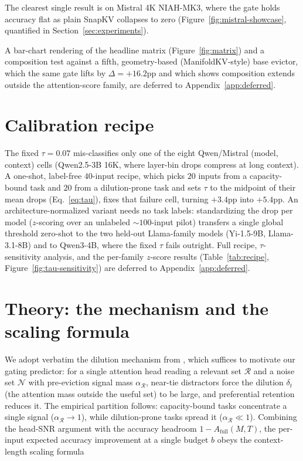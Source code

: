 \documentclass{article}
\begin{document}
The clearest single result is on Mistral 4K NIAH-MK3, where the gate holds
accuracy flat as plain SnapKV collapses to zero
(Figure~\ref{fig:mistral-showcase}, quantified in Section~\ref{sec:experiments}).

A bar-chart rendering of the headline matrix (Figure~\ref{fig:matrix}) and
a composition test against a fifth, geometry-based (ManifoldKV-style) base
evictor, which the same gate lifts by $\Delta = +16.2$pp and which shows
composition extends outside the attention-score family, are deferred to
Appendix~\ref{app:deferred}.

\section{Calibration recipe}
\label{sec:recipe}

The fixed $\tau = 0.07$ mis-classifies only one of the eight
Qwen/Mistral (model, context) cells (Qwen2.5-3B 16K, where layer-bin
drops compress at long context). A one-shot, label-free $40$-input
recipe, which picks $20$ inputs from a capacity-bound task and $20$ from a
dilution-prone task and sets $\tau$ to the midpoint of their mean drops
(Eq.~\eqref{eq:tau}), fixes that failure cell, turning
$+3.4$pp into $+5.4$pp. An architecture-normalized variant needs
no task labels: standardizing the drop per model
($z$-scoring over an unlabeled $\sim 100$-input pilot) transfers a single
global threshold zero-shot to the two held-out Llama-family models
(Yi-1.5-9B, Llama-3.1-8B) and to Qwen3-4B, where the fixed $\tau$ fails
outright. Full recipe, $\tau$-sensitivity analysis, and the per-family
$z$-score results (Table~\ref{tab:recipe},
Figure~\ref{fig:tau-sensitivity}) are deferred to
Appendix~\ref{app:deferred}.

\section{Theory: the mechanism and the scaling formula}
\label{sec:theory}

We adopt verbatim the dilution mechanism from \citet{arxiv260509649},
which suffices to motivate our gating predictor: for a single attention
head reading a relevant set $\mathcal{R}$ and a noise set $\mathcal{N}$
with pre-eviction signal mass $\alpha_{\mathcal{R}}$, near-tie
distractors force the dilution $\delta_t$ (the attention mass outside the
useful set) to be large, and preferential retention reduces it. The
empirical partition follows: capacity-bound tasks concentrate a
single signal ($\alpha_{\mathcal{R}} \to 1$), while dilution-prone tasks spread
it ($\alpha_{\mathcal{R}} \ll 1$). Combining the head-SNR argument
with the accuracy headroom $1 - A_{\mathrm{full}}(M, T)$, the per-input
expected accuracy improvement at a single budget $b$ obeys the
context-length scaling formula
\end{document}
